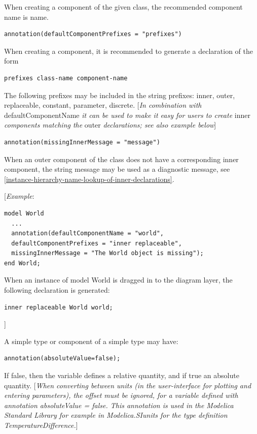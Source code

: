 \documentclass[10pt,a4paper]{report}
\begin{document}
When creating a component of the given class, the recommended component
name is name.
\begin{lstlisting}[language=modelica]
  annotation(defaultComponentPrefixes = "prefixes")
\end{lstlisting}

When creating a component, it is recommended to generate a declaration
of the form
\begin{lstlisting}[language=modelica]
  prefixes class-name component-name 
\end{lstlisting}

The following prefixes may be included in the string prefixes: inner,
outer, replaceable, constant, parameter, discrete. {[}\emph{In
combination with} defaultComponentName \emph{it can be used to make it
easy for users to create} inner \emph{components matching the} outer
\emph{declarations; see also example below}{]}
\begin{lstlisting}[language=modelica]
  annotation(missingInnerMessage = "message")
\end{lstlisting}

When an outer component of the class does not have a corresponding inner
component, the string message may be used as a diagnostic message, see
\ref{instance-hierarchy-name-lookup-of-inner-declarations}.

{[}\emph{Example}:

\begin{lstlisting}[language=modelica]
model World
  ...
  annotation(defaultComponentName = "world",
  defaultComponentPrefixes = "inner replaceable",
  missingInnerMessage = "The World object is missing");
end World;
\end{lstlisting}
When an instance of model World is dragged in to the diagram layer, the
following declaration is generated:
\begin{lstlisting}[language=modelica]
  inner replaceable World world;
\end{lstlisting}

{]}

A simple type or component of a simple type may have:
\begin{lstlisting}[language=modelica]
  annotation(absoluteValue=false); 
\end{lstlisting}

If false, then the variable defines a relative quantity, and if true an
absolute quantity. {[}\emph{When converting between units (in the
user-interface for plotting and entering parameters), the offset must be
ignored, for a variable defined with annotation absoluteValue = false.
This annotation is used in the Modelica Standard Library for example in
Modelica.SIunits for the type definition TemperatureDifference.}{]}
\end{document}
